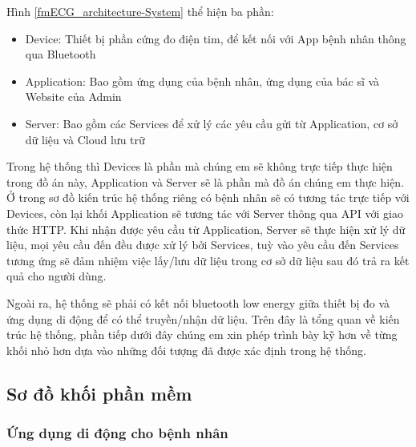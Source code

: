 Hình \ref{fmECG_architecture-System} thể hiện ba phần: 
\begin{itemize}
  \item Device: Thiết bị phần cứng đo điện tim, để kết nối với App bệnh nhân thông qua Bluetooth 
  \item Application: Bao gồm ứng dụng của bệnh nhân, ứng dụng của bác sĩ và Website của Admin
  \item Server: Bao gồm các Services để xử lý các yêu cầu gửi từ Application, cơ sở dữ liệu và Cloud lưu trữ
\end{itemize}

Trong hệ thống thì Devices là phần mà chúng em sẽ không trực tiếp thực hiện trong đồ án này, Application và Server sẽ là
phần mà đồ án chúng em thực hiện. Ở trong sơ đồ kiến trúc hệ thống riêng có bệnh nhân sẽ có tương tác trực tiếp với Devices,
còn lại khối Application sẽ tương tác với Server thông qua API với giao thức HTTP. Khi nhận được yêu cầu từ Application,
Server sẽ thực hiện xử lý dữ liệu, mọi yêu cầu đến đều được xử lý bởi Services, tuỳ vào yêu cầu đến Services tương ứng sẽ đảm nhiệm 
việc lấy/lưu dữ liệu trong cơ sở dữ liệu sau đó trả ra kết quả cho người dùng.

Ngoài ra, hệ thống sẽ phải có kết nối bluetooth low energy giữa thiết bị đo và ứng dụng di động để có thể truyền/nhận dữ liệu.
Trên đây là tổng quan về kiến trúc hệ thống, phần tiếp dưới đây chúng em xin phép trình bày kỹ hơn về từng khối nhỏ hơn
dựa vào những đối tượng đã được xác định trong hệ thống.

\subsection{Sơ đồ khối phần mềm}

\subsubsection{Ứng dụng di động cho bệnh nhân}
\mbox{}

